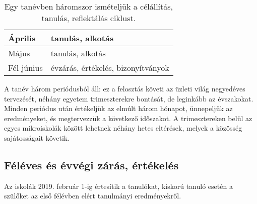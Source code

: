 \begin{table}
\begin{tabular}{ l|l }
    Április          &
    tanulás, alkotás
    \\ \hline

    Május            &
    tanulás, alkotás
    \\ \hline

    Fél június       &
    évzárás, értékelés, bizonyítványok
  \end{tabular}
  \caption{Egy tanévben háromszor ismételjük a célállítás, tanulás,
    reflektálás ciklust.}
  \label{tbl:tanevritmus}
\end{table}

A tanév három periódusból áll: ez a felosztás követi az üzleti világ negyedéves
tervezését, néhány egyetem trimeszterekre bontását, de leginkább az évszakokat.
Minden periódus után értékeljük az elmúlt három hónapot, ünnepeljük az
eredményeket, és megtervezzük a következő időszakot.  A trimesztereken belül az
egyes mikroiskolák között lehetnek néhány hetes eltérések, melyek a közösség
sajátosságait követik.

\subsection{Féléves és évvégi zárás, értékelés}
Az iskolák 2019. február 1-ig értesítik a tanulókat, kiskorú tanuló esetén a szülőket az első félévben elért tanulmányi eredményekről.